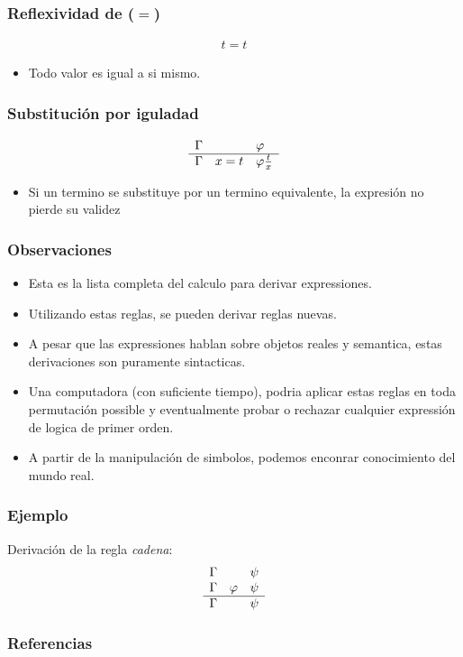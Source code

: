 \documentclass{beamer}
\begin{document}
\begin{frame}
    \frametitle{Reflexividad de ($=$)}
    \[
        \begin{array}{l}
            \hline
            t=t
        \end{array}    
    \]
    \begin{itemize}
        \item{Todo valor es igual a si mismo.}
    \end{itemize}
\end{frame}

\begin{frame}
    \frametitle{Substituci\'on por iguladad}
    \[
        \begin{array}{l l l}
            \Gamma & & \varphi \\
            \hline
            \Gamma & x=t & \varphi\frac{t}{x}
        \end{array}    
    \]
    \begin{itemize}
        \item{Si un termino se substituye por un termino equivalente,
            la expresi\'on no pierde su validez}
    \end{itemize}
\end{frame}

\begin{frame}
    \frametitle{Observaciones}
    \begin{itemize}
        \item{Esta es la lista completa del calculo para derivar expressiones.}
        \item{Utilizando estas reglas, se pueden derivar reglas nuevas.}
        \item{A pesar que las expressiones hablan sobre objetos reales y 
            semantica, estas derivaciones son puramente sintacticas.}
        \item{Una computadora (con suficiente tiempo), podria aplicar
            estas reglas en toda permutaci\'on possible y eventualmente
            probar o rechazar cualquier expressi\'on de logica de primer
            orden.}
        \item{A partir de la manipulaci\'on de simbolos, podemos enconrar
            conocimiento del mundo real.}
    \end{itemize}
\end{frame}

\begin{frame}
    \frametitle{Ejemplo}
    Derivaci\'on de la regla \emph{cadena}:
    \[
        \begin{array}{l l l}
            \Gamma & & \psi \\
            \Gamma & \varphi & \psi \\
            \hline
            \Gamma & & \psi \\
        \end{array}
    \]
\end{frame}

\begin{frame}
    \frametitle{}
\end{frame}

\begin{frame}
    \frametitle{Referencias}
    
    
\end{frame}
\end{document}
